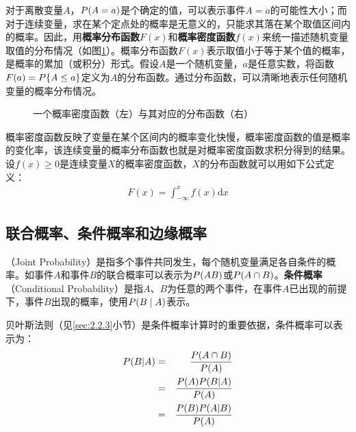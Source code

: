 \parinterval 对于离散变量$A$，${P}(A=a)$是个确定的值，可以表示事件$A=a$的可能性大小；而对于连续变量，求在某个定点处的概率是无意义的，只能求其落在某个取值区间内的概率。因此，用{\small\sffamily\bfseries{概率分布函数}}$F(x)$和{\small\sffamily\bfseries{概率密度函数}}$f(x)$来统一描述随机变量取值的分布情况（如图\ref{fig:2-1}）。概率分布函数$F(x)$表示取值小于等于某个值的概率，是概率的累加（或积分）形式。假设$A$是一个随机变量，$a$是任意实数，将函数$F(a)={P}\{A\leq a\}$定义为$A$的分布函数。通过分布函数，可以清晰地表示任何随机变量的概率分布情况。

\begin{figure}[htp]
\centering
 
\caption{一个概率密度函数（左）与其对应的分布函数（右）}
\label{fig:2-1}
\end{figure}

\parinterval 概率密度函数反映了变量在某个区间内的概率变化快慢，概率密度函数的值是概率的变化率，该连续变量的概率分布函数也就是对概率密度函数求积分得到的结果。设$f(x) \geq 0$是连续变量$X$的概率密度函数，$X$的分布函数就可以用如下公式定义：
\begin{eqnarray}
F(x)=\int_{-\infty}^x f(x)\textrm{d}x
\label{eq:2-1}
\end{eqnarray}


\subsection{联合概率、条件概率和边缘概率}
（Joint Probability）是指多个事件共同发生，每个随机变量满足各自条件的概率。如事件$A$和事件$B$的联合概率可以表示为${P}(AB)$或${P}(A\cap{B})$。{\small\sffamily\bfseries{条件概率}}（Conditional Probability）是指$A$、$B$为任意的两个事件，在事件$A$已出现的前提下，事件$B$出现的概率，使用${P}(B \mid A)$表示。

\parinterval 贝叶斯法则（见\ref{sec:2.2.3}小节）是条件概率计算时的重要依据，条件概率可以表示为：
\begin{eqnarray}
{P}{(B|A)} & = & \frac{{P}(A\cap{B})}{{P}(A)}  \nonumber \\
                           & = & \frac{{P}(A){P}(B|A)}{{P}(A)}  \nonumber \\
                           & = & \frac{{P}(B){P}(A|B)}{{P}(A)}
\label{eq:2-2}
\end{eqnarray}

